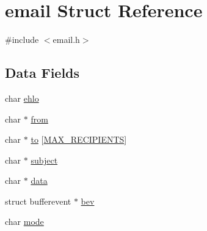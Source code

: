 \hypertarget{structemail}{\section{email Struct Reference}
\label{structemail}
}


{\ttfamily \#include $<$email.\-h$>$}

\subsection*{Data Fields}
\begin{DoxyCompactItemize}
\item 
char \hyperlink{structemail_ab6507ffd67fc6059c2aa721b7b8f8f03}{ehlo}
\item 
char $\ast$ \hyperlink{structemail_a765533dfc643627999c751f7e1514664}{from}
\item 
char $\ast$ \hyperlink{structemail_a501cf38e14279529940ea1df44ca4535}{to} \mbox{[}\hyperlink{email_8h_a14de6dbbf65a1bde6916200bf0215c23}{M\-A\-X\-\_\-\-R\-E\-C\-I\-P\-I\-E\-N\-T\-S}\mbox{]}
\item 
char $\ast$ \hyperlink{structemail_ae31ac864419a577c2982907c23b426d3}{subject}
\item 
char $\ast$ \hyperlink{structemail_a91a70b77df95bd8b0830b49a094c2acb}{data}
\item 
struct bufferevent $\ast$ \hyperlink{structemail_a7a6bf7d3dd8ad7622482a90042e470ef}{bev}
\item 
char \hyperlink{structemail_a000e34997df38c2005a83d63e67d9282}{mode}
\end{DoxyCompactItemize}


